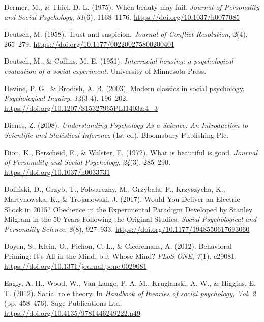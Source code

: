 \documentclass[
  letterpaper,
]{book}
\newlength{\cslhangindent}
\newenvironment{CSLReferences}[2] %
 {\begin{list}{}{%
  \setlength{\itemindent}{0pt}
  \setlength{\leftmargin}{0pt}
  \setlength{\parsep}{0pt}
  \ifodd #1
   \setlength{\leftmargin}{\cslhangindent}
   \setlength{\itemindent}{-1\cslhangindent}
  \fi
  \setlength{\itemsep}{#2\baselineskip}}}
 {\end{list}}
\begin{document}
\begin{CSLReferences}{1}{0}
Dermer, M., \& Thiel, D. L. (1975). When beauty may fail. \emph{Journal
of Personality and Social Psychology}, \emph{31}(6), 1168--1176.
\url{https://doi.org/10.1037/h0077085}

Deutsch, M. (1958). Trust and suspicion. \emph{Journal of Conflict
Resolution}, \emph{2}(4), 265--279.
\url{https://doi.org/10.1177/002200275800200401}

Deutsch, M., \& Collins, M. E. (1951). \emph{Interracial housing; a
psychological evaluation of a social experiment}. University of
Minnesota Press.

Devine, P. G., \& Brodish, A. B. (2003). Modern classics in social
psychology. \emph{Psychological Inquiry}, \emph{14}(3-4), 196--202.
\url{https://doi.org/10.1207/S15327965PLI1403&4_3}

Dienes, Z. (2008). \emph{Understanding {Psychology} {As} a {Science}:
{An} {Introduction} to {Scientific} and {Statistical} {Inference}} (1st
ed). Bloomsbury Publishing Plc.

Dion, K., Berscheid, E., \& Walster, E. (1972). What is beautiful is
good. \emph{Journal of Personality and Social Psychology}, \emph{24}(3),
285--290. \url{https://doi.org/10.1037/h0033731}

Doliński, D., Grzyb, T., Folwarczny, M., Grzybała, P., Krzyszycha, K.,
Martynowska, K., \& Trojanowski, J. (2017). Would {You} {Deliver} an
{Electric} {Shock} in 2015? {Obedience} in the {Experimental} {Paradigm}
{Developed} by {Stanley} {Milgram} in the 50 {Years} {Following} the
{Original} {Studies}. \emph{Social Psychological and Personality
Science}, \emph{8}(8), 927--933.
\url{https://doi.org/10.1177/1948550617693060}

Doyen, S., Klein, O., Pichon, C.-L., \& Cleeremans, A. (2012).
Behavioral {Priming}: {It}'s {All} in the {Mind}, but {Whose} {Mind}?
\emph{PLoS ONE}, \emph{7}(1), e29081.
\url{https://doi.org/10.1371/journal.pone.0029081}

Eagly, A. H., Wood, W., Van Lange, P. A. M., Kruglanski, A. W., \&
Higgins, E. T. (2012). Social role theory. In \emph{Handbook of theories
of social psychology, {Vol}. 2} (pp. 458--476). Sage Publications Ltd.
\url{https://doi.org/10.4135/9781446249222.n49}


\end{CSLReferences}
\end{document}
